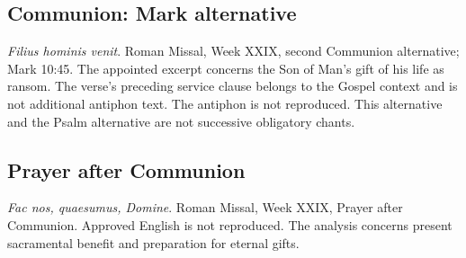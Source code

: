 \subsection{Communion: Mark alternative}
\label{proper-communion-mark}
\textit{Filius hominis venit}. Roman Missal, Week XXIX, second Communion alternative; Mark 10:45. The appointed excerpt concerns the Son of Man's gift of his life as ransom. The verse's preceding service clause belongs to the Gospel context and is not additional antiphon text. The antiphon is not reproduced. This alternative and the Psalm alternative are not successive obligatory chants.

\subsection{Prayer after Communion}
\label{proper-after-communion}
\textit{Fac nos, quaesumus, Domine}. Roman Missal, Week XXIX, Prayer after Communion. Approved English is not reproduced. The analysis concerns present sacramental benefit and preparation for eternal gifts.
